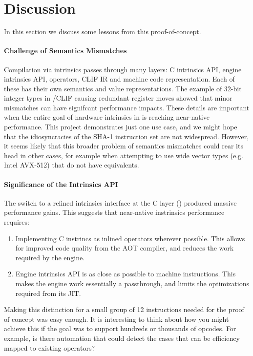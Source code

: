 \section{Discussion}
\label{sec:discussion}

In this section we discuss some lessons from this proof-of-concept.

\paragraph{Challenge of Semantics Mismatches}

Compilation via intrinsics passes through many layers: C intrinsics API, engine
intrinsics API, \wasm operators, CLIF IR and machine code representation. Each
of these has their own semantics and value representations.  The example of
32-bit integer types in \wasm/CLIF causing redundant register moves showed that
minor mismatches can have signifcant performance impacts. These details are
important when the entire goal of hardware intrinsics in \wasm is reaching
near-native performance. This project demonstrates just one use case, and we
might hope that the idiosyncracies of the SHA-1 instruction set are not
widespread. However, it seems likely that this broader problem of semantics
mismatches could rear its head in other cases, for example when attempting to
use wide vector types (e.g. Intel AVX-512) that do not have \wasm equivalents.

\paragraph{Significance of the Intrinsics API}

The switch to a refined intrinsics interface at the C layer ()
produced massive performance gains. This suggests that near-native
instrinsics performance requires:
%
\begin{enumerate}
    \item Implementing C instrincs as inlined \wasm operators wherever possible.
    This allows for improved code quality from the AOT compiler, and reduces the
    work required by the engine.
    \item Engine intrinsics API is as close as possible to machine instructions.
    This makes the engine work essentially a passthrough, and limits the
    optimizations required from its JIT.
\end{enumerate}

Making this distinction for a small group of 12 instructions needed for the
proof of concept was easy enough.  It is interesting to think about how you
might achieve this if the goal was to support hundreds or thousands of opcodes.
For example, is there automation that could detect the cases that can be
efficiency mapped to existing \wasm operators?

